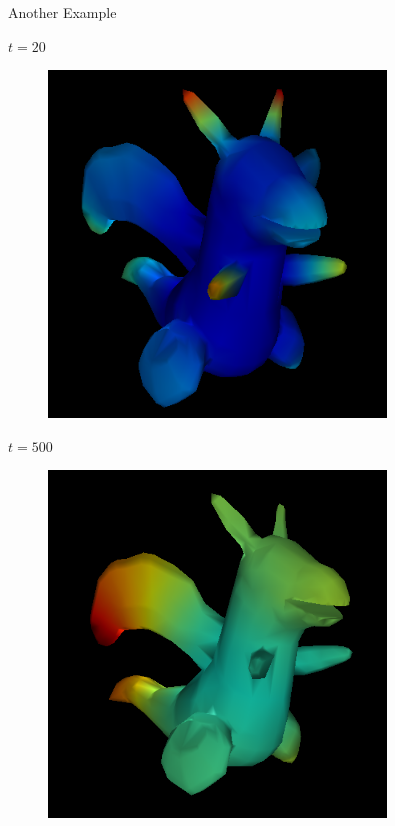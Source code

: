 \documentclass{beamer}
\begin{document}
\begin{frame}{Another Example}

\begin{minipage}{0.45\textwidth}{
$t = 20$
\begin{figure}[t]
    \includegraphics[width=0.8\textwidth]{DragonHKS_20.png}
\end{figure}
}
\end{minipage}
\begin{minipage}{0.45\textwidth}
$t = 500$
\begin{figure}[t]
    \includegraphics[width=0.8\textwidth]{DragonHKS_200.png}
\end{figure}
\end{minipage}

\end{frame}
\end{document}
